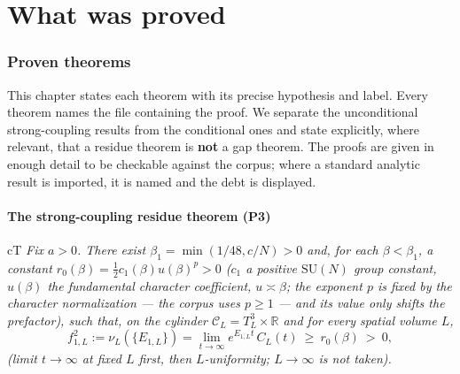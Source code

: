 \clearpage
\part{What was proved}
\section{Proven theorems}

\figproofdag
\label{sec:theorems}

This chapter states each theorem with its precise hypothesis and label. Every theorem names the
file containing the proof. We separate the unconditional strong-coupling results from the
conditional ones and state explicitly, where relevant, that a residue theorem is \textbf{not} a
gap theorem. The proofs are given in enough detail to be checkable against the corpus; where a
standard analytic result is imported, it is named and the debt is displayed.

\subsection{The strong-coupling residue theorem (P3)}
\label{sec:p3}


\begin{claimbox}{cT}
 \emph{Fix $a>0$. There exist $\beta_1=\min(1/48,c/N)>0$ and, for
each $\beta<\beta_1$, a constant $r_0(\beta)=\tfrac12 c_1(\beta)u(\beta)^p>0$ ($c_1$ a positive
$\mathrm{SU}(N)$ group constant, $u(\beta)$ the fundamental character coefficient,
$u\asymp\beta$; the exponent $p$ is fixed by the character normalization --- the corpus uses
$p\ge1$ --- and its value only shifts the prefactor), such that, on the cylinder
$\mathcal C_L=T^3_L\times\mathbb R$ and for every spatial volume $L$,}
\begin{equation}
f_{1,L}^2:=\nu_L(\{E_{1,L}\})=\lim_{t\to\infty}e^{E_{1,L}t}\,C_L(t)\ \ge\ r_0(\beta)\ >\ 0,
\label{eq:p3}
\end{equation}
\emph{(limit $t\to\infty$ at fixed $L$ first, then $L$-uniformity; $L\to\infty$ is not taken).}
\end{claimbox}

